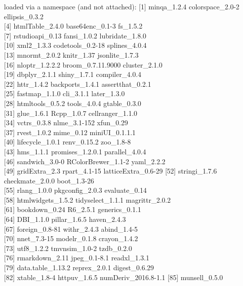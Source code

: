 \documentclass[
  english,
  man,floatsintext]{apa7}
\begin{document}
loaded via a namespace (and not attached):
{[}1{]} minqa\_1.2.4 colorspace\_2.0-2 ellipsis\_0.3.2\\
{[}4{]} htmlTable\_2.4.0 base64enc\_0.1-3 fs\_1.5.2\\
{[}7{]} rstudioapi\_0.13 fansi\_1.0.2 lubridate\_1.8.0\\
{[}10{]} xml2\_1.3.3 codetools\_0.2-18 splines\_4.0.4\\
{[}13{]} mnormt\_2.0.2 knitr\_1.37 jsonlite\_1.7.3\\
{[}16{]} nloptr\_1.2.2.2 broom\_0.7.11.9000 cluster\_2.1.0\\
{[}19{]} dbplyr\_2.1.1 shiny\_1.7.1 compiler\_4.0.4\\
{[}22{]} httr\_1.4.2 backports\_1.4.1 assertthat\_0.2.1\\
{[}25{]} fastmap\_1.1.0 cli\_3.1.1 later\_1.3.0\\
{[}28{]} htmltools\_0.5.2 tools\_4.0.4 gtable\_0.3.0\\
{[}31{]} glue\_1.6.1 Rcpp\_1.0.7 cellranger\_1.1.0\\
{[}34{]} vctrs\_0.3.8 nlme\_3.1-152 xfun\_0.29\\
{[}37{]} rvest\_1.0.2 mime\_0.12 miniUI\_0.1.1.1\\
{[}40{]} lifecycle\_1.0.1 renv\_0.15.2 zoo\_1.8-8\\
{[}43{]} hms\_1.1.1 promises\_1.2.0.1 parallel\_4.0.4\\
{[}46{]} sandwich\_3.0-0 RColorBrewer\_1.1-2 yaml\_2.2.2\\
{[}49{]} gridExtra\_2.3 rpart\_4.1-15 latticeExtra\_0.6-29
{[}52{]} stringi\_1.7.6 checkmate\_2.0.0 boot\_1.3-26\\
{[}55{]} rlang\_1.0.0 pkgconfig\_2.0.3 evaluate\_0.14\\
{[}58{]} htmlwidgets\_1.5.2 tidyselect\_1.1.1 magrittr\_2.0.2\\
{[}61{]} bookdown\_0.24 R6\_2.5.1 generics\_0.1.1\\
{[}64{]} DBI\_1.1.0 pillar\_1.6.5 haven\_2.4.3\\
{[}67{]} foreign\_0.8-81 withr\_2.4.3 abind\_1.4-5\\
{[}70{]} nnet\_7.3-15 modelr\_0.1.8 crayon\_1.4.2\\
{[}73{]} utf8\_1.2.2 tmvnsim\_1.0-2 tzdb\_0.2.0\\
{[}76{]} rmarkdown\_2.11 jpeg\_0.1-8.1 readxl\_1.3.1\\
{[}79{]} data.table\_1.13.2 reprex\_2.0.1 digest\_0.6.29\\
{[}82{]} xtable\_1.8-4 httpuv\_1.6.5 numDeriv\_2016.8-1.1
{[}85{]} munsell\_0.5.0\\
\end{document}

